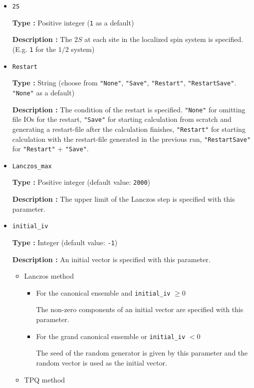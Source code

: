 \begin{itemize}
\item \verb|2S|

{\bf Type :} Positive integer (\verb|1| as a default)

{\bf Description :} The $2 S$ at each site in the localized spin system is specified.
(E.g. \verb|1| for the $1/2$ system)

\item \verb|Restart|

  {\bf Type :} String (choose from \verb|"None"|, \verb|"Save"|, \verb|"Restart"|,  
  \verb|"RestartSave"|. \verb|"None"| as a default)

  {\bf Description :} The condition of the restart is specified.
  \verb|"None"| for omitting file IOs for the restart,
  \verb|"Save"| for starting calculation from scratch
  and generating a restart-file after the calculation finishes,
  \verb|"Restart"| for starting calculation with the
  restart-file generated in the previous run,
  \verb|"RestartSave"| for \verb|"Restart"| + \verb|"Save"|.

\item \verb|Lanczos_max|

{\bf Type :} Positive integer (default value: \verb|2000|)

{\bf Description :} The upper limit of the Lanczos step is specified with this parameter.

\item \verb|initial_iv|

{\bf Type :} Integer (default value: \verb|-1|)

{\bf Description :} 
{An initial vector is specified with this parameter.}
\begin{itemize}
\item{Lanczos method}
\begin{itemize}
\item{For the canonical ensemble and \verb|initial_iv| $\geq 0$}

The non-zero components of an initial vector are specified with this parameter. 

\item{For the grand canonical ensemble or \verb|initial_iv| $< 0$}

The seed of the random generator is given by this parameter and the random vector is used as the initial vector.
\end{itemize}

\item{TPQ method}


\end{itemize}
\end{itemize}
